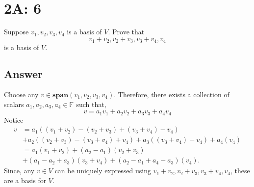 \documentclass[
	12pt, %
]{fphw}
\newcommand\F[1]{\text{$\mathbb{F}^{#1}$}}
\newcommand\spann[1]{\mathbf{span}(#1)}
\begin{document}


\section*{2A: 6}

\begin{problem}
Suppose $v_1, v_2, v_3, v_4$ is a basis of $V$. Prove that
$$
v_1 + v_2, v_2 + v_3, v_3 + v_4, v_4
$$
is a basis of $V$.
\end{problem}


\subsection*{Answer} Choose any $v \in \spann{v_1, v_2, v_3, v_4}$. Therefore, there exists a collection of scalars $a_1, a_2, a_3, a_4 \in \F{}$ such that,
$$
v = a_1v_1 + a_2v_2 + a_3v_3 + a_4v_4
$$
Notice
\begin{align*}
v &= a_1((v_1 + v_2) - (v_2 + v_3) + (v_3 + v_4) - v_4) \\
&+ a_2 ((v_2 + v_3) - (v_3 + v_4) + v_4) + a_3((v_3 + v_4) - v_4) + a_4(v_4)\\
&=a_1(v_1+v_2) + (a_2-a_1)(v_2+v_3) \\
&+ (a_1-a_2+a_3)(v_3 + v_4) + (a_2-a_1+a_4-a_3)(v_4).
\end{align*}
Since, any $v \in V$ can be uniquely expressed using $v_1 + v_2, v_2 + v_3, v_3 + v_4, v_4$, these are a basis for $V$.
\end{document}
